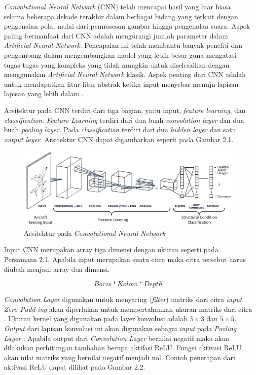 \emph{Convolutional Neural Network} (CNN) telah mencapai hasil yang luar biasa selama beberapa dekade terakhir dalam berbagai bidang yang terkait dengan pengenalan pola, mulai dari pemrosesan gambar hingga pengenalan suara. Aspek paling bermanfaat dari CNN adalah mengurangi jumlah parameter dalam \emph{Artificial Neural Network}. Pencapaian ini telah membantu banyak peneliti dan pengembang dalam mengembangkan model yang lebih besar guna mengatasi tugas-tugas yang kompleks yang tidak mungkin untuk diselesaikan dengan menggunakan \emph{Artificial Neural Network} klasik. Aspek penting dari CNN adalah untuk mendapatkan fitur-fitur abstrak ketika input menyebar menuju lapisan-lapisan yang lebih dalam \parencite{8308186}.

Arsitektur pada CNN terdiri dari tiga bagian, yaitu input, \emph{feature learning}, dan \emph{classification}. \emph{Feature Learning} terdiri dari dua buah \emph{convolution layer} dan dua buah \emph{pooling layer}. Pada \emph{classification} terdiri dari dua \emph{hidden layer} dan satu \emph{output layer}. Arsitektur CNN dapat digambarkan seperti pada Gambar 2.1.

\begin{figure} [ht] \centering
    \includegraphics[scale=0.12]{gambar/arsitekturcnn.png}
    \caption{Arsitektur pada \emph{Convolutional Neural Network}}
    \label{fig:arsitektur cnn}
\end{figure}

Input CNN merupakan array tiga dimensi dengan ukuran seperti pada Persamaan 2.1. Apabila input merupakan suatu citra maka citra tersebut harus diubah menjadi array dua dimensi. 

\begin{equation}
Baris * Kolom * Depth
\end{equation}

\emph{Convolution Layer} digunakan untuk menyaring (\emph{filter}) matriks dari citra \emph{input}. \emph{Zero Padd-ing} akan diperlukan untuk mempertahankan ukuran matriks dari citra \parencite{dwitama2019klasifikasi}. Ukuran kernel yang digunakan pada layer konvolusi adalah \(3 \times 3\) dan \(5 \times 5\). \emph{Output} dari lapisan konvolusi ini akan digunakan sebagai \emph{input} pada \emph{Pooling Layer} \parencite{hakim2018penerapan}. Apabila output dari \emph{Convolution Layer} bernilai negatif maka akan dilakukan perhitungan tambahan berupa aktifasi ReLU. Fungsi aktivasi ReLU akan nilai matriks yang bernilai negatif menjadi nol. Contoh penerapan dari aktivasi ReLU dapat dilihat pada Gambar 2.2.


